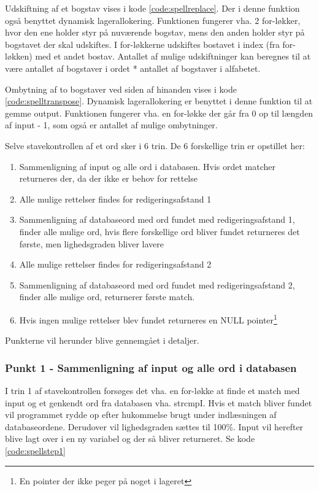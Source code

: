 
Udskiftning af et bogstav vises i kode \ref{code:spellreplace}. Der i denne funktion også benyttet dynamisk lagerallokering. Funktionen fungerer vha. 2 for-løkker, hvor den ene holder styr på nuværende bogstav, mens den anden holder styr på bogstavet der skal udskiftes. I for-løkkerne udskiftes bostavet i index (fra for-løkken) med et andet bostav. Antallet af mulige udskiftninger kan beregnes til at være antallet af bogstaver i ordet * antallet af bogstaver i alfabetet.


Ombytning af to bogstaver ved siden af hinanden vises i kode \ref{code:spelltranspose}. Dynamisk lagerallokering er benyttet i denne funktion til at gemme output. Funktionen fungerer vha. en for-løkke der går fra 0 op til længden af input - 1, som også er antallet af mulige ombytninger.


Selve stavekontrollen af et ord sker i 6 trin. De 6 forskellige trin er opstillet her:
\begin{enumerate}
    \item Sammenligning af input og alle ord i databasen. Hvis ordet matcher returneres der, da der ikke er behov for rettelse
    \item Alle mulige rettelser findes for redigeringsafstand 1
    \item Sammenligning af databaseord med ord fundet med redigeringsafstand 1, finder alle mulige ord, hvis flere forskellige ord bliver fundet returneres det første, men lighedsgraden bliver lavere
    \item Alle mulige rettelser findes for redigeringsafstand 2
    \item Sammenligning af databaseord med ord fundet med redigeringsafstand 2, finder alle mulige ord, returnerer første match.
    \item Hvis ingen mulige rettelser blev fundet returneres en NULL pointer\footnote{En pointer der ikke peger på noget i lageret}
\end{enumerate}

Punkterne vil herunder blive gennemgået i detaljer.

\subsubsection*{Punkt 1 - Sammenligning af input og alle ord i databasen}
I trin 1 af stavekontrollen forsøges det vha. en for-løkke at finde et match med input og et genkendt ord fra databasen vha. strcmpI. Hvis et match bliver fundet vil programmet rydde op efter hukommelse brugt under indlæsningen af databaseordene. Derudover vil lighedsgraden sættes til 100\%. Input vil herefter blive lagt over i en ny variabel og der så bliver returneret. Se kode \ref{code:spellstep1}

